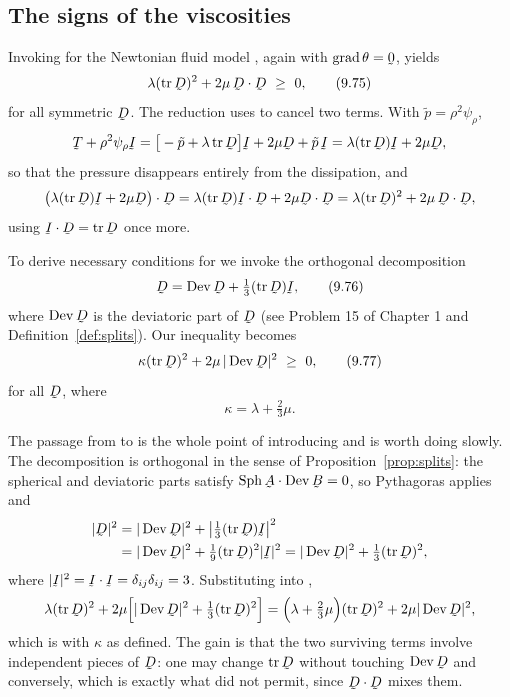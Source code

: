 \subsection*{The signs of the viscosities}

Invoking  for the Newtonian fluid model , again with
$\grad\theta=\bze$, yields
\begin{equation}
   \lambda(\tr\bD)^{2}+2\mu\,\ip\bD\bD\ \geq\ 0 ,
   \tag{9.75}\label{eq:9.75}
\end{equation}
for all symmetric $\bD$. The reduction uses  to cancel two
terms. With $\tilde p=\rho^{2}\psi_{\rho}$,
\[
   \bT+\rho^{2}\psi_{\rho}\I
   =\big[-\tilde p+\lambda\tr\bD\big]\I+2\mu\bD+\tilde p\,\I
   =\lambda(\tr\bD)\I+2\mu\bD ,
\]
so that the pressure disappears entirely from the dissipation, and
\[
   \ip{\big(\lambda(\tr\bD)\I+2\mu\bD\big)}\bD
   =\lambda(\tr\bD)\ip\I\bD+2\mu\ip\bD\bD
   =\lambda(\tr\bD)^{2}+2\mu\,\ip\bD\bD ,
\]
using $\ip\I\bD=\tr\bD$ once more.

To derive necessary conditions for  we invoke the orthogonal
decomposition
\begin{equation}
   \bD=\Dev\bD+\tfrac13(\tr\bD)\I,
   \tag{9.76}\label{eq:9.76}
\end{equation}
where $\Dev\bD$ is the deviatoric part of $\bD$ (see Problem 15 of
Chapter 1 and Definition~\ref{def:splits}). Our inequality becomes
\begin{equation}
   \kappa(\tr\bD)^{2}+2\mu\,|\Dev\bD|^{2}\ \geq\ 0 ,
   \tag{9.77}\label{eq:9.77}
\end{equation}
for all $\bD$, where
\begin{equation}
   \kappa=\lambda+\tfrac23\mu .
   \tag{9.78}\label{eq:9.78}
\end{equation}

The passage from  to  is the whole point of
introducing  and is worth doing slowly. The decomposition is
orthogonal in the sense of Proposition~\ref{prop:splits}: the spherical
and deviatoric parts satisfy $\ip{\Sph\bA}{\Dev\bB}=0$, so Pythagoras
applies and
\[
\begin{aligned}
   |\bD|^{2}&=|\Dev\bD|^{2}+\big|\tfrac13(\tr\bD)\I\big|^{2}
   \\
   &=|\Dev\bD|^{2}+\tfrac19(\tr\bD)^{2}|\I|^{2}
   =|\Dev\bD|^{2}+\tfrac13(\tr\bD)^{2},
\end{aligned}
\]
where $|\I|^{2}=\ip\I\I=\dd_{ij}\dd_{ij}=3$. Substituting into
,
\[
   \lambda(\tr\bD)^{2}+2\mu\Big[|\Dev\bD|^{2}
   +\tfrac13(\tr\bD)^{2}\Big]
   =\Big(\lambda+\tfrac23\mu\Big)(\tr\bD)^{2}+2\mu|\Dev\bD|^{2},
\]
which is  with $\kappa$ as defined. The gain is that the two
surviving terms involve independent pieces of $\bD$: one may
change $\tr\bD$ without touching $\Dev\bD$ and conversely, which is
exactly what  did not permit, since $\ip\bD\bD$ mixes them.

